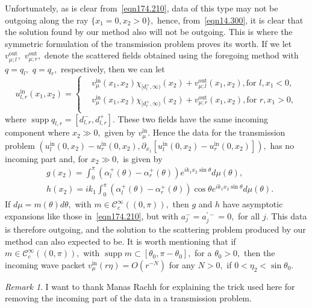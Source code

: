 \documentclass[11pt]{article}
\newcommand\In{\operatorname{in}}
\newcommand\out{\operatorname{out}}
\newcommand\cC{\mathcal{C}}
\newcommand\pa{\partial}
\newcommand\supp{\operatorname{supp}}
\theoremstyle{definition}
\theoremstyle{remark}
\newtheorem{remark}{Remark}
\begin{document}
Unfortunately, as is clear from~\eqref{eqn174.210}, data of this type may not be
outgoing along the ray $\{x_1=0, x_2>0\},$ hence, from~\eqref{eqn14.300}, it is
clear that the solution found by our method also will not be outgoing. This is where
the symmetric formulation of the transmission problem proves its worth. If we
let $v^{\out}_{\mu;l},$ $v^{\out}_{\mu;r},$ denote the scattered fields obtained
using the foregoing method with $q=q_l,$ $q=q_r,$ respectively, then we can let
\begin{equation}
  u^{\In}_{l,r}(x_1,x_2)=
  \begin{cases}
    &v^{\In}_{\mu}(x_1,x_2)\chi_{[d_l^+,\infty)}(x_2)+v^{\out}_{\mu;l}(x_1,x_2),\text{
        for }l, x_1<0,\\
       &v^{\In}_{\mu}(x_1,x_2)\chi_{[d_r^+,\infty)}(x_2)+v^{\out}_{\mu;r}(x_1,x_2),\text{
        for }r, x_1>0,\\
  \end{cases}
\end{equation}
where $\supp q_{l,r}=[d_{l,r}^-,d_{l,r}^+].$ These two fields have the same
incoming component where $x_2\gg 0,$ given by $v^{\In}_{\mu}.$ Hence the data
for the transmission
problem $(u^{\In}_l(0,x_2)-u^{\In}_r(0,x_2),\pa_{x_1}[u^{\In}_l(0,x_2)-u^{\In}_r(0,x_2)]),$
has no incoming part and, for $x_2\gg 0,$ is given by
\begin{equation}
  \begin{split}
     &g(x_2)=\int_{0}^{\pi}
     (\alpha^+_l(\theta)-\alpha^+_r(\theta))e^{ik_1x_2\sin\theta} d\mu(\theta),\\
      &h(x_2)=ik_1\int_{0}^{\pi}
    (\alpha^+_l(\theta)-\alpha^+_r(\theta))\cos\theta e^{ik_1x_2\sin\theta} d\mu(\theta).
  \end{split}
\end{equation}
If $d\mu=m(\theta)d\theta,$ with $m\in\cC^{\infty}_c((0,\pi)),$ then $g$ and $h$
have asymptotic expansions like those in~\eqref{eqn174.210}, but with
$a_j^-=a_j^{'-}=0,$ for all $j.$ This data is therefore outgoing, and the
solution to the scattering problem produced by our method can also expected to
be.  It is worth mentioning that if $m\in\cC^{\infty}_c((0,\pi)),$ with $\supp
m\subset [\theta_0,\pi-\theta_0],$ for a $\theta_0>0,$ then the incoming wave
packet $v_{\mu}^{\In}(r\eta)=O(r^{-N})$ for any $N>0,$ if
$0<\eta_2<\sin\theta_0.$
\begin{remark}
  I want to thank Manas Rachh for explaining the trick used here for removing the incoming
  part of the data in a transmission problem.
\end{remark}
\end{document}
